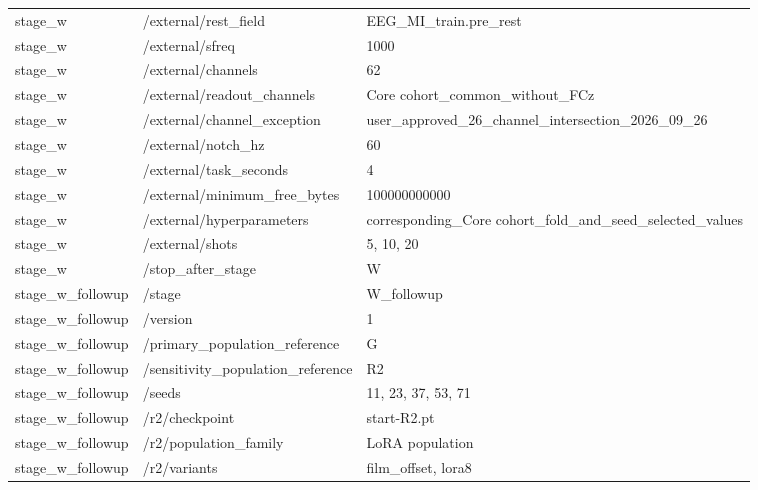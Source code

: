 \begin{longtable}{p{.65in}p{2.8in}p{3.2in}}
stage\_\allowbreak{}w & /external/rest\_\allowbreak{}field & EEG\_\allowbreak{}MI\_\allowbreak{}train.pre\_\allowbreak{}rest \\
stage\_\allowbreak{}w & /external/sfreq & 1000 \\
stage\_\allowbreak{}w & /external/channels & 62 \\
stage\_\allowbreak{}w & /external/readout\_\allowbreak{}channels & Core cohort\_\allowbreak{}common\_\allowbreak{}without\_\allowbreak{}FCz \\
stage\_\allowbreak{}w & /external/channel\_\allowbreak{}exception & user\_\allowbreak{}approved\_\allowbreak{}26\_\allowbreak{}channel\_\allowbreak{}intersection\_\allowbreak{}2026\_\allowbreak{}09\_\allowbreak{}26 \\
stage\_\allowbreak{}w & /external/notch\_\allowbreak{}hz & 60 \\
stage\_\allowbreak{}w & /external/task\_\allowbreak{}seconds & 4 \\
stage\_\allowbreak{}w & /external/minimum\_\allowbreak{}free\_\allowbreak{}bytes & 100000000000 \\
stage\_\allowbreak{}w & /external/hyperparameters & corresponding\_\allowbreak{}Core cohort\_\allowbreak{}fold\_\allowbreak{}and\_\allowbreak{}seed\_\allowbreak{}selected\_\allowbreak{}values \\
stage\_\allowbreak{}w & /external/shots & 5, 10, 20 \\
stage\_\allowbreak{}w & /stop\_\allowbreak{}after\_\allowbreak{}stage & W \\
stage\_\allowbreak{}w\_\allowbreak{}followup & /stage & W\_\allowbreak{}followup \\
stage\_\allowbreak{}w\_\allowbreak{}followup & /version & 1 \\
stage\_\allowbreak{}w\_\allowbreak{}followup & /primary\_\allowbreak{}population\_\allowbreak{}reference & G \\
stage\_\allowbreak{}w\_\allowbreak{}followup & /sensitivity\_\allowbreak{}population\_\allowbreak{}reference & R2 \\
stage\_\allowbreak{}w\_\allowbreak{}followup & /seeds & 11, 23, 37, 53, 71 \\
stage\_\allowbreak{}w\_\allowbreak{}followup & /r2/checkpoint & start-R2.pt \\
stage\_\allowbreak{}w\_\allowbreak{}followup & /r2/population\_\allowbreak{}family & LoRA population \\
stage\_\allowbreak{}w\_\allowbreak{}followup & /r2/variants & film\_\allowbreak{}offset, lora8 \\

\end{longtable}
